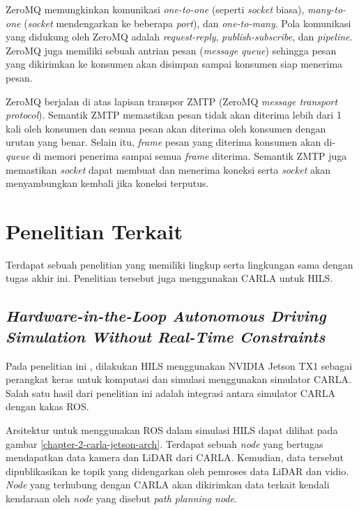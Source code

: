 ZeroMQ memungkinkan komunikasi \textit{one-to-one} (seperti \textit{socket}
biasa), \textit{many-to-one} (\textit{socket} mendengarkan ke beberapa
\textit{port}), dan \textit{one-to-many}. Pola komunikasi yang didukung oleh
ZeroMQ adalah \textit{request-reply}, \textit{publish-subscribe}, dan
\textit{pipeline}. ZeroMQ juga memiliki sebuah antrian pesan (\textit{message
    queue}) sehingga pesan yang dikirimkan ke konsumen akan disimpan
sampai konsumen siap menerima pesan.

ZeroMQ berjalan di atas lapisan transpor ZMTP (ZeroMQ \textit{message transport
    protocol}). Semantik ZMTP memastikan pesan tidak akan diterima lebih dari 1 kali
oleh konsumen dan semua pesan akan diterima oleh konsumen dengan urutan yang
benar. Selain itu, \textit{frame} pesan yang diterima konsumen akan
di-\textit{queue} di memori penerima sampai semua \textit{frame} diterima.
Semantik ZMTP juga memastikan \textit{socket} dapat membuat dan menerima koneksi
serta \textit{socket} akan menyambungkan kembali jika koneksi terputus.

\section{Penelitian Terkait}

Terdapat sebuah penelitian yang memiliki lingkup serta lingkungan sama dengan
tugas akhir ini. Penelitian tersebut juga menggunakan CARLA untuk HILS.

\subsection{\textit{Hardware-in-the-Loop Autonomous Driving Simulation Without
        Real-Time Constraints}}

Pada penelitian ini \parencite{brogle_CarlaHILS}, dilakukan HILS menggunakan
NVIDIA Jetson TX1 sebagai perangkat keras untuk komputasi dan simulasi
menggunakan simulator CARLA. Salah satu hasil dari penelitian ini adalah
integrasi antara simulator CARLA dengan kakas ROS.

Arsitektur untuk menggunakan ROS dalam simulasi HILS dapat dilihat pada gambar
\ref{chapter-2-carla-jetson-arch}. Terdapat sebuah \textit{node}  yang
bertugas mendapatkan data kamera dan LiDAR dari CARLA. Kemudian, data tersebut
dipublikasikan ke topik yang didengarkan oleh pemroses data LiDAR dan vidio.
\textit{Node} yang terhubung dengan CARLA akan dikirimkan data terkait kendali
kendaraan oleh \textit{node} yang disebut \textit{path planning node}.

